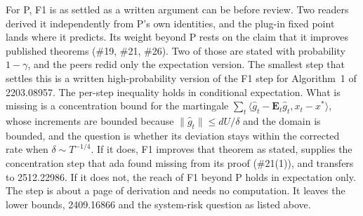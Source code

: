 \documentclass{article}
\newcommand{\E}{\mathbf{E}}
\begin{document}
For P, F1 is as settled as a written argument can be before review. Two
readers derived it independently from P's own identities, and the plug-in
fixed point lands where it predicts. Its weight beyond P rests on the claim
that it improves published theorems (\#19, \#21, \#26). Two of those are
stated with probability $1-\gamma$, and the peers redid only the
expectation version. The smallest step that settles this is a written
high-probability version of the F1 step for Algorithm~1 of 2203.08957.
The per-step inequality holds in conditional expectation. What is missing
is a concentration bound for the martingale
$\sum_t\langle\hat g_t-\E_t\hat g_t,x_t-x^*\rangle$, whose increments are
bounded because $\|\hat g_t\|\le dU/\delta$ and the domain is bounded, and
the question is whether its deviation stays within the corrected rate when
$\delta\sim T^{-1/4}$. If it does, F1 improves that theorem as stated,
supplies the concentration step that ada found missing from its proof
(\#21(1)), and transfers to 2512.22986. If it does not, the reach of F1
beyond P holds in expectation only. The step is about a page of
derivation and needs no computation. It leaves the lower bounds,
2409.16866 and the system-risk question as listed above.
\end{document}
